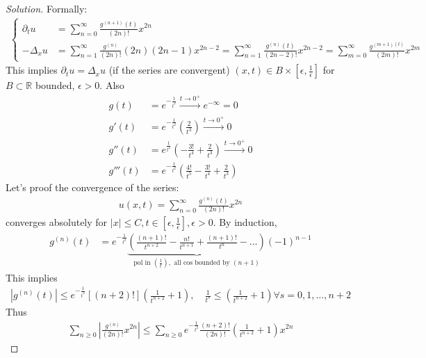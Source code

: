 \documentclass{report}
\theoremstyle{tommy}
\begin{document}
  \begin{proof}[Solution]
    Formally:
    \begin{align*}
      \left\{
        \begin{aligned}
          \partial_t u &= \sum_{n=0}^\infty \frac{g^{(n+1)}(t)}{(2n)!} x^{2n} \\
          -\Delta_x u &= \sum_{n=1}^\infty \frac{g^{(n)}}{(2n)!} (2n)(2n-1)x^{2n-2}
          = \sum_{n=1}^\infty \frac{g^{(n)}(t)}{(2n-2)!} x^{2n-2}
          = \sum_{m=0}^\infty \frac{g^{(m+1)(t)}}{(2m)!} x^{2m}
        \end{aligned}
      \right.
    \end{align*}
    This implies \(\partial_t u = \Delta_x u\) (if the series are convergent) \((x,t) \in B \times \left[\epsilon, \frac{1}{\epsilon}\right]\) for \(B \subset \mathbb{R}\) bounded, \(\epsilon > 0\). Also
    \begin{align*}
      g(t) &= e^{- \frac{1}{t^2}} \xrightarrow{t \to 0^+} e^{-\infty} = 0 \\
      g'(t) &= e^{- \frac{1}{t^2}} \left(\frac{2}{t^3}\right) \xrightarrow{t \to 0^+} 0 \\
      g''(t) &= e^{\frac{1}{t^2}} \left(- \frac{3!}{t^4} + \frac{2}{t^3}\right) \xrightarrow{t \to 0^+} 0 \\
      g'''(t) &= e^{- \frac{1}{t^2}} \left(\frac{4!}{t^5} - \frac{3!}{t^4} + \frac{2}{t^3}\right)
    \end{align*}
    Let's proof the convergence of the series:
    \begin{align*}
      u(x,t) = \sum_{n=0}^\infty \frac{g^{(n)}(t)}{(2n)!} x^{2n}
    \end{align*}
    converges absolutely for \(|x| \le C, t \in \left[\epsilon, \frac{1}{\epsilon}\right], \epsilon > 0\). By induction,
    \begin{align*}
      g^{(n)}(t) &= e^{-\frac{1}{t^2}} \underbrace{\left(\frac{(n+1)!}{t^{n+2}} - \frac{n!}{t^{n+1}} + \frac{(n+1)!}{t^n} - \dots\right)}_{\text{pol in } (\frac{1}{t}), \text{ all cos bounded by }(n+1)}(-1)^{n-1}
    \end{align*}
    This implies
    \begin{align*}
      |g^{(n)}(t)| \le e^{-\frac{1}{t^2}}[(n+2)!] \left(\frac{1}{t^{n+2}} + 1\right), \quad \frac{1}{t^s} \le \left(\frac{1}{t^{n+2}} + 1\right) \forall s =0,1,\dots, n+2
    \end{align*}
    Thus 
    \begin{align*}
      \sum_{n \ge 0} \left| \frac{g^{(n)}}{(2n)!}x^{2n}\right| \le \sum_{n \ge 0} e^{- \frac{1}{t^2}} \frac{(n+2)!}{(2n)!} \left(\frac{1}{t^{n+2}}+1\right)x^{2n}

\end{align*}
\end{proof}
\end{document}
